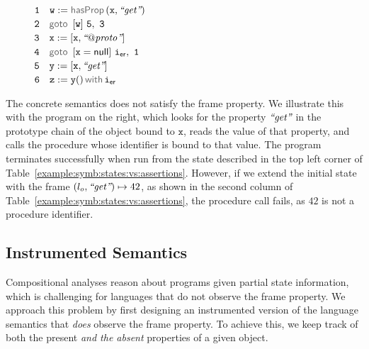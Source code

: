 \begin{figure}
\vspace*{-0.2cm}
{\footnotesize
\hspace*{-0.47cm} $\mathtt{1\quad w := \hasfield(x, \litstring{get})}$ \\[-0.08cm]
\hspace*{-0.47cm} $\mathtt{2\quad \ifgoto{w}{5}{3}}$ \\[-0.08cm]
\hspace*{-0.47cm} $\mathtt{3\quad x := [x, \text{{\it ``\ensuremath{\mathit{@proto}}''}}] }$ \\ [-0.08cm]
\hspace*{-0.47cm} $\mathtt{4\quad \ifgoto{x = \jnull}{\errlab}{1}}$ \\[-0.08cm]
\hspace*{-0.47cm} $\mathtt{5\quad y := [x, \text{{\it ``get''}}]}$ \\[-0.08cm]
\hspace*{-0.47cm} $\mathtt{6\quad \jsilcall{z}{y}{}{\errlab}}$ 
}
\vspace*{-0.2cm}
\end{figure}




The \jsil concrete semantics does not satisfy the frame property. 
We illustrate this with the program on the right, which 
looks for the property $\text{{\it ``get''}}$ in the 
prototype chain of the object bound to $\mathtt{x}$, reads the value of that 
property, and calls the procedure whose identifier is bound to that value. 
The program terminates successfully when run from the state 
described in the top left corner of Table~\ref{example:symb:states:vs:assertions}. However, if we extend the initial state with the frame $(l_o, \text{{\it ``get''}}) \mapsto 42$, 
as shown in the second column of Table~\ref{example:symb:states:vs:assertions}, the procedure 
call fails, as $42$ is not a procedure identifier. 

\vspace*{-0.2cm}
\subsection{\jsil Instrumented Semantics}\label{subsec:instrumented}

Compositional analyses reason about programs given partial state information,
which is challenging for languages that do not observe the frame property.
We approach this problem by first designing an instrumented version of the language semantics that \emph{does} 
observe the frame property. To achieve this, we keep track of both the present \emph{and the absent} properties of a given object.

